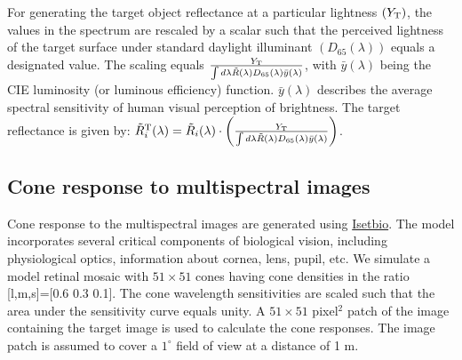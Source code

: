 \documentclass{jov}
\begin{document}
For generating the target object reflectance at a particular lightness $(Y_{\rm T})$, the values in the spectrum are 
rescaled by a scalar such that the perceived lightness of the 
target surface under standard daylight illuminant $(D_{65}(\lambda))$ 
equals a designated value. The scaling equals $\frac{Y_{\rm T}}{\int d\lambda \tilde{R}(\lambda) D_{65}(\lambda) \bar{y}(\lambda)}$, with $\bar{y}(\lambda)$ being the CIE luminosity (or luminous efficiency) function. 
$\bar{y}(\lambda)$ describes the average spectral sensitivity of human visual 
perception of brightness. The target reflectance is given by: $\tilde{R}^{\rm T}_i(\lambda) =\tilde{R}_i(\lambda) \cdot\left(\frac{Y_{\rm T}}{\int d\lambda \tilde{R}(\lambda) D_{65}(\lambda) \bar{y}(\lambda)}\right)$.

\subsection{Cone response to multispectral images}
Cone response to the multispectral images are generated
using \href{https://github.com/isetbio}{Isetbio}. The model incorporates several critical components of biological vision, including physiological optics, information about cornea, lens, pupil, etc. We simulate a model retinal mosaic with $51\times51$ cones having cone densities in the ratio [l,m,s]=[0.6 0.3 0.1]. The cone wavelength sensitivities are scaled such that the area under the sensitivity curve equals unity. A $51\times51$ pixel$^2$ patch of the image containing the target image is used to calculate the cone responses. The image patch is assumed to cover a $1^{\circ}$ field of view at a distance of 1 m.



\end{document}
